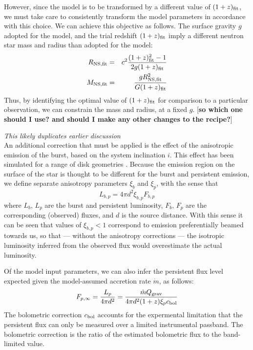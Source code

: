\documentclass{aastex63}
\begin{document}
However, since the model is to be transformed by a different value of $(1+z)_{\rm fit}$, we must take care to consistently transform the model parameters in accordance with this choice.
%
We can achieve this objective as follows. The surface gravity $g$ adopted for the model, and the trial redshift $(1+z)_{\rm fit}$ imply a different neutron star mass and radius than adopted for the model: 
%
\begin{eqnarray}
R_{\rm NS,fit} &=& c^2\frac{(1+z)_{\rm fit}^2-1}{2g(1+z)_{\rm fit}}\\
M_{\rm NS,fit} &=& \frac{gR_{\rm NS,fit}^2}{G(1+z)_{\rm fit}}
\end{eqnarray}
Thus, by identifying the optimal value of $(1+z)_{\rm fit}$ for comparison to a particular observation, we can constrain the mass and radius, at a fixed $g$. [{\bf so which one should I use? and should I make any other changes to the recipe?}]

{\it This likely duplicates earlier discussion} \\
%
An additional correction that must be applied is the effect of the anisotropic emission of the burst, based on the system inclination $i$. This effect has been simulated for a range of disk geometries \cite[e.g.][]{he16}. Because the emission region on the surface of the star is thought to be different for the burst and persistent emission, we define separate anisotropy parameters $\xi_b$ and $\xi_p$, with the sense that
\begin{equation}
L_{b,p} = 4\pi d^2\xi_{b,p}F_{b,p}
\end{equation}
where $L_b$, $L_p$ are the burst and persistent luminosity, $F_b$, $F_p$ are the corresponding (observed) fluxes, and $d$ is the source distance. With this sense it can be seen that values of $\xi_{b,p}<1$ correspond to emission preferentially beamed towards us, so that --- without the anisotropy corrections --- the isotropic luminosity inferred from the observed flux would overestimate the actual luminosity.

Of the model input parameters, we can also infer the persistent flux level expected given the model-assumed accretion rate $\dot{m}$, as follows: %
\begin{equation}
F_{p,\infty} = \frac{L_p}{4\pi d^2} = 
\frac{\dot{m} Q_{\rm grav}}{4\pi d^2 (1+z)\xi_p c_{\rm bol}}
\end{equation}
%
The bolometric correction $c_{\rm bol}$ accounts for the expermental limitation that the persistent flux can only be measured over a limited instrumental passband. The bolometric correction is the ratio of the estimated bolometric flux to the band-limited value.
\end{document}
